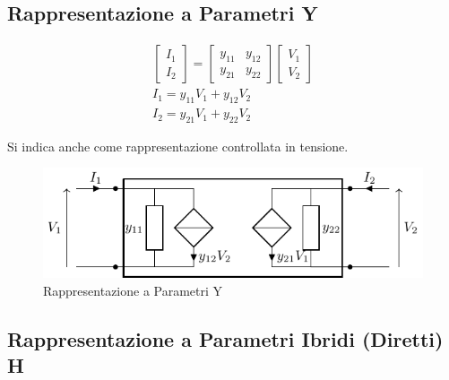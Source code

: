 \documentclass{article}
\numberwithin{equation}{subsection}
\begin{document}
\subsection{Rappresentazione a Parametri Y}

\begin{gather*}
    \begin{bmatrix}
        I_1\\I_2
    \end{bmatrix}=\begin{bmatrix}
        y_{11}&y_{12}\\y_{21}&y_{22}
    \end{bmatrix}\begin{bmatrix}
        V_1\\V_2
    \end{bmatrix}\\
    I_1=y_{11}V_1+y_{12}V_2\\
    I_2=y_{21}V_1+y_{22}V_2
\end{gather*}

Si indica anche come rappresentazione controllata in tensione. 

\begin{figure}[ht]%
    \centering
    \includegraphics{rappresentazione-parametri-y.pdf}
    \caption{Rappresentazione a Parametri Y}
    \label{fig:rappresentazione-parametri-y}
\end{figure}

\subsection{Rappresentazione a Parametri Ibridi (Diretti) H}
\end{document}
